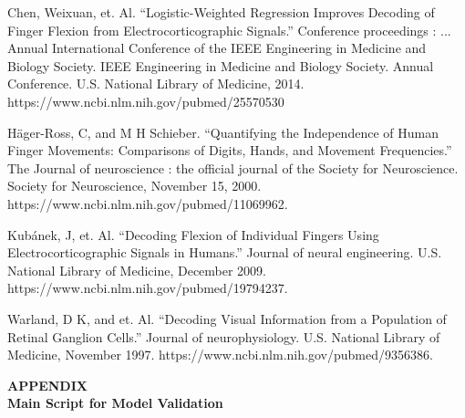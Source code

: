 \documentclass{article}
\begin{document}
\newpage
\begin{thebibliography}{}
Chen, Weixuan, et. Al. “Logistic-Weighted Regression Improves Decoding of Finger Flexion from Electrocorticographic Signals.” Conference proceedings : ... Annual International Conference of the IEEE Engineering in Medicine and Biology Society. IEEE Engineering in Medicine and Biology Society. Annual Conference. U.S. National Library of Medicine, 2014. https://www.ncbi.nlm.nih.gov/pubmed/25570530

Häger-Ross, C, and M H Schieber. “Quantifying the Independence of Human Finger Movements: Comparisons of Digits, Hands, and Movement Frequencies.” The Journal of neuroscience : the official journal of the Society for Neuroscience. Society for Neuroscience, November 15, 2000. https://www.ncbi.nlm.nih.gov/pubmed/11069962.

Kubánek, J, et. Al. “Decoding Flexion of Individual Fingers Using Electrocorticographic Signals in Humans.” Journal of neural engineering. U.S. National Library of Medicine, December 2009. https://www.ncbi.nlm.nih.gov/pubmed/19794237.

Warland, D K, and et. Al. “Decoding Visual Information from a Population of Retinal Ganglion Cells.” Journal of neurophysiology. U.S. National Library of Medicine, November 1997. https://www.ncbi.nlm.nih.gov/pubmed/9356386.

\end{thebibliography}
\newpage
\textbf{APPENDIX}\\
	\textbf{Main Script for Model Validation}
\end{document}
